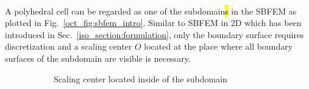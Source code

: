 \paragraph{}
A polyhedral cell can be regarded as one of the subdomain\hl{s} in the SBFEM as plotted in Fig.~\ref{oct_fig:sbfem_intro}.
Similar to SBFEM in 2D which has been introduced in Sec.~\ref{iso_section:formulation}, only the boundary surface requires discretization and a scaling center $O$ located at the place where all boundary surfaces of the subdomain are visible is necessary.
%
\begin{figure}
    \centering
    \begin{subfigure}[b]{0.48\linewidth}
        \caption{Scaling center located inside of the subdomain}
        \label{oct_fig:sbfem_intro_a}
    \end{subfigure}
    \begin{subfigure}[b]{0.48\linewidth}
        \scalebox{0.5}{
}
\end{subfigure}
\end{figure}
